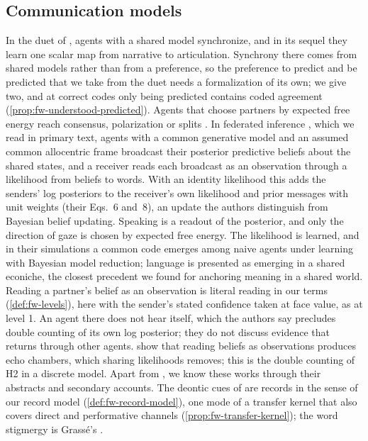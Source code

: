 \subsection{Communication models}\label{sup:rel-communication-models}

In the duet of \citet{friston2015duet}, agents with a shared model synchronize, and in its sequel \citep{friston2015hermeneutics} they learn one scalar map from narrative to articulation. Synchrony there comes from shared models rather than from a preference, so the preference to predict and be predicted that we take from the duet needs a formalization of its own; we give two, and at correct codes only being predicted contains coded agreement (\cref{prop:fw-understood-predicted}). Agents that choose partners by expected free energy reach consensus, polarization or splits \citep{albarracin2022epistemic,kastel2023small}. In federated inference \citep{friston2024federated}, which we read in primary text, agents with a common generative model and an assumed common allocentric frame broadcast their posterior predictive beliefs about the shared states, and a receiver reads each broadcast as an observation through a likelihood from beliefs to words. With an identity likelihood this adds the senders' log posteriors to the receiver's own likelihood and prior messages with unit weights (their Eqs.~6 and~8), an update the authors distinguish from Bayesian belief updating. Speaking is a readout of the posterior, and only the direction of gaze is chosen by expected free energy. The likelihood is learned, and in their simulations a common code emerges among naive agents under learning with Bayesian model reduction; language is presented as emerging in a shared econiche, the closest precedent we found for anchoring meaning in a shared world. Reading a partner's belief as an observation is literal reading in our terms (\cref{def:fw-levels}), here with the sender's stated confidence taken at face value, as at level 1. An agent there does not hear itself, which the authors say precludes double counting of its own log posterior; they do not discuss evidence that returns through other agents. \citet{catal2025belief} show that reading beliefs as observations produces echo chambers, which sharing likelihoods removes; this is the double counting of H2 in a discrete model. Apart from \citet{friston2024federated}, we know these works through their abstracts and secondary accounts. The deontic cues of \citet{constant2019regimes} are records in the sense of our record model (\cref{def:fw-record-model}), one mode of a transfer kernel that also covers direct and performative channels (\cref{prop:fw-transfer-kernel}); the word stigmergy is Grass\'e's \citep{grasse1959reconstruction}.


